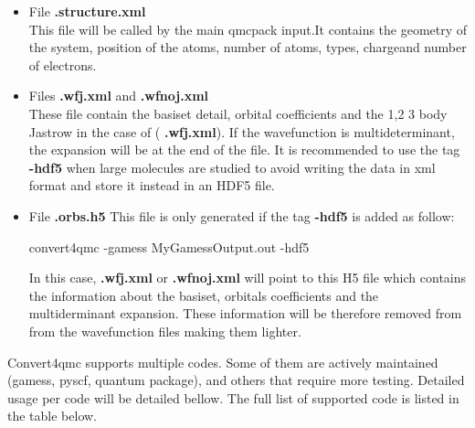 \begin{itemize}
\begin{shade}
\end{shade}

 \item File \textbf{.structure.xml} \\
 This file will be called by the main qmcpack input.It contains the geometry of the system, position of the atoms, number of atoms, types, chargeand number of electrons.
 
 \item Files \textbf{.wfj.xml} and \textbf{.wfnoj.xml}\\
 These file contain the basiset detail, orbital coefficients and the 1,2 3 body Jastrow in the case of (  \textbf{.wfj.xml}). If the wavefunction is multideterminant, the expansion will be at the end of the file. It is recommended to use the tag \textbf{-hdf5} when large molecules are studied to avoid writing the data in xml format and store it instead in an HDF5 file. 
 
 \item File \textbf{.orbs.h5}
 This file is only generated if the tag \textbf{-hdf5} is added as follow:
 \begin{shade}
  convert4qmc -gamess MyGamessOutput.out -hdf5
 \end{shade}
In this case,  \textbf{.wfj.xml} or \textbf{.wfnoj.xml} will point to this H5 file which contains the information about the basiset, orbitals coefficients and the multiderminant expansion. These information will be therefore removed from from the wavefunction files making them lighter. 

\end{itemize}


Convert4qmc supports multiple codes. Some of them are actively maintained (gamess, pyscf, quantum package), and others that require more testing. Detailed usage per code will be detailed bellow. The full list of supported code is listed in the table below.

